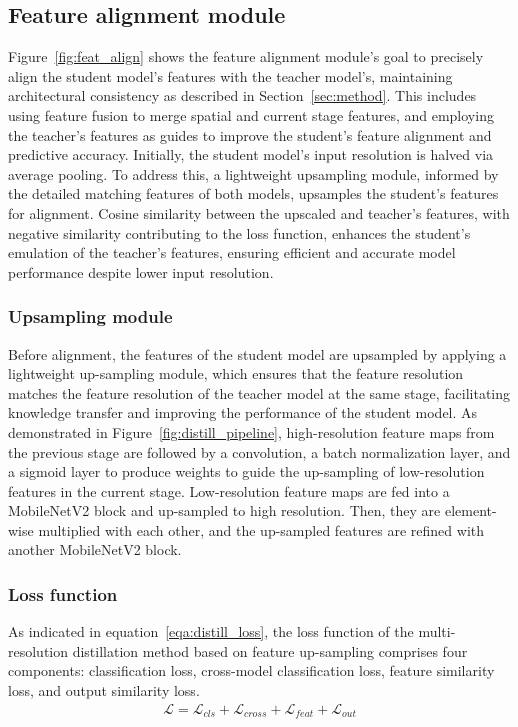 \subsection{Feature alignment module}

Figure~\ref{fig:feat_align} shows the feature alignment module's goal to precisely align the student model's features with the teacher model's, maintaining architectural consistency as described in Section~\ref{sec:method}. This includes using feature fusion to merge spatial and current stage features, and employing the teacher's features as guides to improve the student's feature alignment and predictive accuracy. Initially, the student model's input resolution is halved via average pooling. To address this, a lightweight upsampling module, informed by the detailed matching features of both models, upsamples the student's features for alignment. Cosine similarity between the upscaled and teacher's features, with negative similarity contributing to the loss function, enhances the student's emulation of the teacher's features, ensuring efficient and accurate model performance despite lower input resolution.

\subsubsection{Upsampling module}
Before alignment, the features of the student model are upsampled by applying a lightweight up-sampling module, which ensures that the feature resolution matches the feature resolution of the teacher model at the same stage, facilitating knowledge transfer and improving the performance of the student model. As demonstrated in Figure~\ref{fig:distill_pipeline}, high-resolution feature maps from the previous stage are followed by a convolution, a batch normalization layer, and a sigmoid layer to produce weights to guide the up-sampling of low-resolution features in the current stage. 
Low-resolution feature maps are fed into a  MobileNetV2 block and up-sampled to high resolution.
Then, they are element-wise multiplied with each other, and the up-sampled features are refined with another MobileNetV2 block.

\subsubsection{Loss function}
As indicated in equation~\ref{eqa:distill_loss}, the loss function of the multi-resolution distillation method based on feature up-sampling comprises four components: classification loss, cross-model classification loss, feature similarity loss, and output similarity loss.
\begin{equation}
\begin{split}
\label{eqa:distill_loss}
\mathcal{L}=\mathcal{L}_{cls}+\mathcal{L}_{cross}+\mathcal{L}_{feat}+\mathcal{L}_{out} \\ 
\end{split}
\end{equation}

